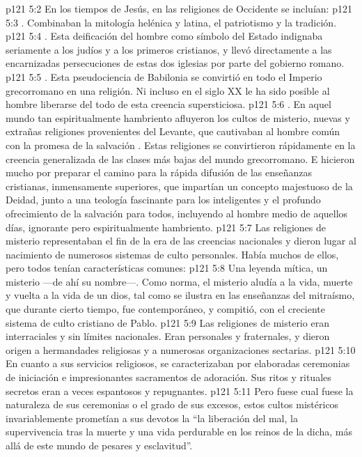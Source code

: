 \vs p121 5:2 En los tiempos de Jesús, en las religiones de Occidente se incluían:
\vs p121 5:3 . Combinaban la mitología helénica y latina, el patriotismo y la tradición.
\vs p121 5:4 . Esta deificación del hombre como símbolo del Estado indignaba seriamente a los judíos y a los primeros cristianos, y llevó directamente a las encarnizadas persecuciones de estas dos iglesias por parte del gobierno romano.
\vs p121 5:5 . Esta pseudociencia de Babilonia se convirtió en todo el Imperio grecorromano en una religión. Ni incluso en el siglo XX le ha sido posible al hombre liberarse del todo de esta creencia supersticiosa.
\vs p121 5:6 . En aquel mundo tan espiritualmente hambriento afluyeron los cultos de misterio, nuevas y extrañas religiones provenientes del Levante, que cautivaban al hombre común con la promesa de la salvación . Estas religiones se convirtieron rápidamente en la creencia generalizada de las clases más bajas del mundo grecorromano. E hicieron mucho por preparar el camino para la rápida difusión de las enseñanzas cristianas, inmensamente superiores, que impartían un concepto majestuoso de la Deidad, junto a una teología fascinante para los inteligentes y el profundo ofrecimiento de la salvación para todos, incluyendo al hombre medio de aquellos días, ignorante pero espiritualmente hambriento.
\vs p121 5:7 \pc Las religiones de misterio representaban el fin de la era de las creencias nacionales y dieron lugar al nacimiento de numerosos sistemas de culto personales. Había muchos de ellos, pero todos tenían características comunes:
\vs p121 5:8 Una leyenda mítica, un misterio ---de ahí su nombre---. Como norma, el misterio aludía a la vida, muerte y vuelta a la vida de un dios, tal como se ilustra en las enseñanzas del mitraísmo, que durante cierto tiempo, fue contemporáneo, y compitió, con el creciente sistema de culto cristiano de Pablo.
\vs p121 5:9 Las religiones de misterio eran interraciales y sin límites nacionales. Eran personales y fraternales, y dieron origen a hermandades religiosas y a numerosas organizaciones sectarias.
\vs p121 5:10 En cuanto a sus servicios religiosos, se caracterizaban por elaboradas ceremonias de iniciación e impresionantes sacramentos de adoración. Sus ritos y rituales secretos eran a veces espantosos y repugnantes.
\vs p121 5:11 Pero fuese cual fuese la naturaleza de sus ceremonias o el grado de sus excesos, estos cultos mistéricos invariablemente prometían a sus devotos la  “la liberación del mal, la supervivencia tras la muerte y una vida perdurable en los reinos de la dicha, más allá de este mundo de pesares y esclavitud”.
